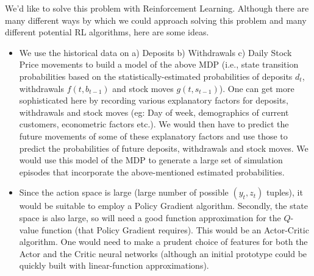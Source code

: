 \documentclass[12pt]{exam}
\begin{document}
\begin{questions}
We'd like to solve this problem with Reinforcement Learning. Although there are many different ways by which we could approach solving this problem and many different potential RL algorithms, here are some ideas.
\begin{itemize}
\item We use the historical data on a) Deposits b) Withdrawals c) Daily Stock Price movements to build a model of the above MDP (i.e., state transition probabilities based on the statistically-estimated probabilities of deposits $d_t$, withdrawals $f(t,b_{t-1})$ and stock moves $g(t,s_{t-1})$). One can get more sophisticated here by recording various explanatory factors for deposits, withdrawals and stock moves (eg: Day of week, demographics of current customers, econometric factors etc.). We would then have to predict the future movements of some of these explanatory factors and use those to predict the probabilities of future deposits, withdrawals and stock moves. We would use this model of the MDP to generate a large set of simulation episodes that incorporate the above-mentioned estimated probabilities. 
\item Since the action space is large (large number of possible $(y_t,z_t)$ tuples), it would be suitable to employ a Policy Gradient algorithm. Secondly, the state space is also large, so will need a good function approximation for the $Q$-value function (that Policy Gradient requires). This would be an Actor-Critic algorithm. One would need to make a prudent choice of features for both the Actor and the Critic neural networks (although an initial prototype could be quickly built with linear-function approximations).
\end{itemize}
 
\end{questions}
\end{document}
